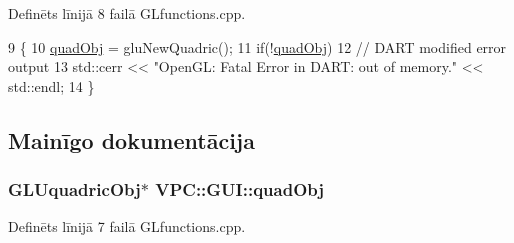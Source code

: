 Definēts līnijā 8 failā G\+Lfunctions.\+cpp.


\begin{DoxyCode}
9 \{
10     \hyperlink{namespace_v_p_c_1_1_g_u_i_a0a2d963cfdc95564bad5be52225b4df8}{quadObj} = gluNewQuadric();
11     \textcolor{keywordflow}{if}(!\hyperlink{namespace_v_p_c_1_1_g_u_i_a0a2d963cfdc95564bad5be52225b4df8}{quadObj})
12         \textcolor{comment}{// DART modified error output}
13         std::cerr << \textcolor{stringliteral}{"OpenGL: Fatal Error in DART: out of memory."} << std::endl;
14 \}
\end{DoxyCode}


\subsection{Mainīgo dokumentācija}
\subsubsection[{\texorpdfstring{quad\+Obj}{quadObj}}]{\setlength{\rightskip}{0pt plus 5cm}G\+L\+Uquadric\+Obj$\ast$ V\+P\+C\+::\+G\+U\+I\+::quad\+Obj\hspace{0.3cm}{\ttfamily [static]}}\hypertarget{namespace_v_p_c_1_1_g_u_i_a0a2d963cfdc95564bad5be52225b4df8}{}\label{namespace_v_p_c_1_1_g_u_i_a0a2d963cfdc95564bad5be52225b4df8}


Definēts līnijā 7 failā G\+Lfunctions.\+cpp.

